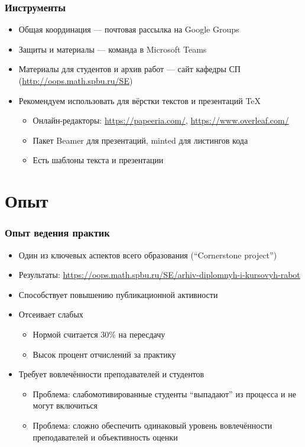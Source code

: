 \documentclass[xetex,mathserif,serif]{beamer}
\begin{document}
    \begin{frame}
        \frametitle{Инструменты}
        \begin{itemize}
            \item Общая координация --- почтовая рассылка на Google Groups
            \item Защиты и материалы --- команда в Microsoft Teams
            \item Материалы для  студентов и архив работ --- сайт кафедры СП (\url{http://oops.math.spbu.ru/SE})
            \item Рекомендуем использовать для вёрстки текстов и презентаций TeX
            \begin{itemize}
                \item Онлайн-редакторы: \url{https://papeeria.com/}, \url{https://www.overleaf.com/}
                \item Пакет Beamer для презентаций, minted для листингов кода
                \item Есть шаблоны текста и презентации
            \end{itemize}
        \end{itemize}
    \end{frame}

    \section{Опыт}

    \begin{frame}
        \frametitle{Опыт ведения практик}
        \begin{itemize}
            \item Один из  ключевых аспектов всего образования (``Cornerstone project'')
            \item Результаты: \url{https://oops.math.spbu.ru/SE/arhiv-diplomnyh-i-kursovyh-rabot}
            \item Способствует повышению публикационной активности
            \item Отсеивает слабых
            \begin{itemize}
                \item Нормой считается 30\% на пересдачу
                \item Высок процент отчислений за практику
            \end{itemize}
            \item Требует вовлечённости преподавателей и студентов
            \begin{itemize}
                \item Проблема: слабомотивированные студенты ``выпадают'' из процесса и не могут включиться
                \item Проблема: сложно обеспечить одинаковый уровень вовлечённости преподавателей и объективность оценки
            \end{itemize}
        \end{itemize}
    \end{frame}
\end{document}
